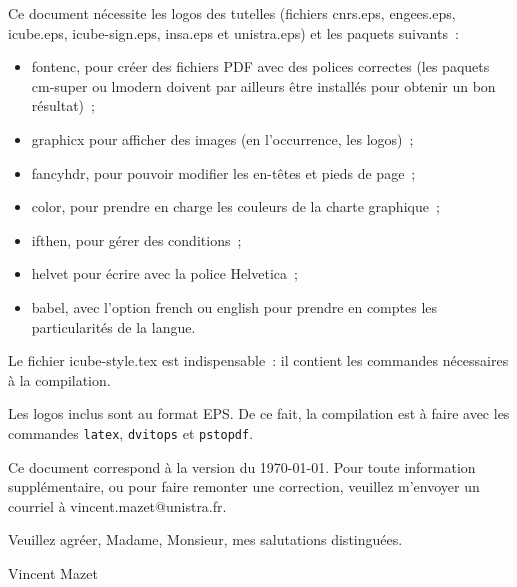 \documentclass[a4paper,11pt,twosided]{letter}
\begin{document}
Ce document nécessite les logos des tutelles (fichiers cnrs.eps, engees.eps, icube.eps, icube-sign.eps, insa.eps et unistra.eps)
et les paquets suivants~:
\begin{itemize}
  
  \item fontenc, pour créer des fichiers PDF avec des polices correctes
  (les paquets cm-super ou lmodern doivent par ailleurs être installés pour obtenir un bon résultat)~;

  \item graphicx pour afficher des images (en l'occurrence, les logos)~;

  \item fancyhdr, pour pouvoir modifier les en-têtes et pieds de page~;

  \item color, pour prendre en charge les couleurs de la charte graphique~;

  \item ifthen, pour gérer des conditions~;

  \item helvet pour écrire avec la police Helvetica~;

  \item babel, avec l'option french ou english pour prendre en comptes les particularités de la langue.

\end{itemize}
Le fichier icube-style.tex est indispensable~: il contient les commandes nécessaires à la compilation.

\bigskip

Les logos inclus sont au format EPS. De ce fait, la compilation est à faire avec les commandes \texttt{latex}, \texttt{dvitops} et \texttt{pstopdf}.

\bigskip

Ce document correspond à la version du \today.
Pour toute information supplémentaire, ou pour faire remonter une correction, veuillez m'envoyer un courriel à vincent.mazet@unistra.fr.

\bigskip

Veuillez agréer, Madame, Monsieur, mes salutations distinguées.

\bigskip\bigskip

\hfill Vincent Mazet
\end{document}

